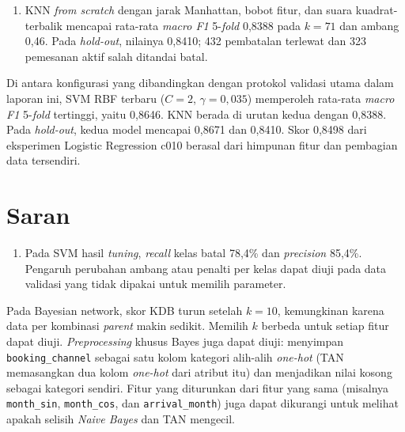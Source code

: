 \begin{enumerate}
	\textit{stochastic gradient ascent} dan regularisasi L1, L2, serta Elastic Net.
	Pada konfigurasi dasar, \textit{grid search} memilih laju belajar 0,1 dan 1.000
	pembaruan dengan rata-rata \textit{macro F1} 5-\textit{fold} 0,7274. Pada
	eksperimen c010, L-BFGS memperoleh \textit{macro F1} validasi 0,8498, lebih
	tinggi daripada \textit{mini-batch} SGD (0,8424) dan \textit{batch gradient
	descent} (0,8420) pada fitur yang sama.
	\item KNN \textit{from scratch} dengan jarak Manhattan, bobot fitur, dan
	suara kuadrat-terbalik mencapai rata-rata \textit{macro F1} 5-\textit{fold}
	0,8388 pada $k=71$ dan ambang 0,46. Pada \textit{hold-out}, nilainya 0,8410;
	432 pembatalan terlewat dan 323 pemesanan aktif salah ditandai batal.
\end{enumerate}

Di antara konfigurasi yang dibandingkan dengan protokol validasi utama dalam
laporan ini, SVM RBF terbaru ($C=2$, $\gamma=0{,}035$) memperoleh rata-rata
\textit{macro F1} 5-\textit{fold} tertinggi, yaitu 0,8646. KNN berada
di urutan kedua dengan 0,8388. Pada \textit{hold-out}, kedua model mencapai
0,8671 dan 0,8410. Skor 0,8498 dari eksperimen Logistic Regression c010
berasal dari himpunan fitur dan pembagian data tersendiri.

\section{Saran}

\begin{enumerate}
	\item Pada SVM hasil \textit{tuning}, \textit{recall} kelas batal 78,4\%
	dan \textit{precision} 85,4\%. Pengaruh perubahan ambang atau penalti
	per kelas dapat diuji pada data validasi yang tidak dipakai untuk
	memilih parameter.
\end{enumerate}

Pada Bayesian network, skor KDB turun setelah $k=10$, kemungkinan karena data per
kombinasi \textit{parent} makin sedikit. Memilih $k$ berbeda untuk setiap fitur dapat diuji.
\textit{Preprocessing} khusus Bayes juga dapat diuji: menyimpan \texttt{booking\_channel}
sebagai satu kolom kategori alih-alih \textit{one-hot} (TAN memasangkan dua kolom
\textit{one-hot} dari atribut itu) dan menjadikan nilai kosong sebagai kategori sendiri.
Fitur yang diturunkan dari fitur yang sama (misalnya \texttt{month\_sin},
\texttt{month\_cos}, dan \texttt{arrival\_month}) juga dapat dikurangi untuk
melihat apakah selisih \textit{Naive Bayes} dan TAN mengecil.

